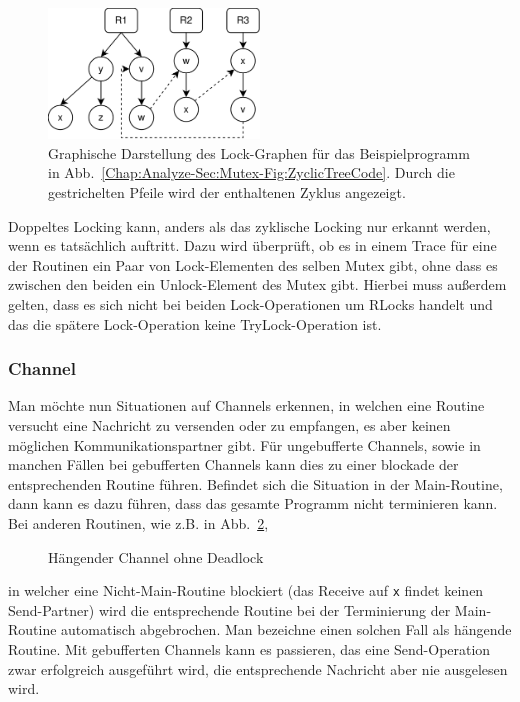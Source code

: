 \begin{figure}[h!]
  \centering
  \includegraphics[width=0.5\textwidth]{img/tree_example.eps}
  \caption{Graphische Darstellung des Lock-Graphen für das Beispielprogramm in 
    Abb.~\ref{Chap:Analyze-Sec:Mutex-Fig:ZyclicTreeCode}. Durch die gestrichelten 
    Pfeile wird der enthaltenen Zyklus angezeigt.}
    \label{Chap:Analyze-Sec:Mutex-Fig:ZyclicTreeImg}
\end{figure}
Doppeltes Locking kann, anders als das zyklische Locking nur erkannt werden, 
wenn es tatsächlich auftritt. Dazu wird überprüft, ob es in einem Trace 
für eine der Routinen ein Paar von Lock-Elementen des selben Mutex gibt, 
ohne dass es zwischen den beiden ein Unlock-Element des Mutex gibt. 
Hierbei muss außerdem gelten, dass es sich nicht bei beiden Lock-Operationen 
um RLocks handelt und das die spätere Lock-Operation keine TryLock-Operation ist.  



\subsubsection{Channel}\label{Chap:Theo-Sec:Analyze-SubSec:Channel}
Man möchte nun Situationen auf Channels erkennen, in welchen eine 
Routine versucht eine Nachricht zu versenden oder zu empfangen, es aber 
keinen möglichen Kommunikationspartner gibt. Für ungebufferte 
Channels, sowie in manchen Fällen bei gebufferten Channels kann dies zu einer 
blockade der entsprechenden Routine führen. Befindet sich die Situation in 
der Main-Routine, dann kann es dazu führen, dass das gesamte Programm 
nicht terminieren kann. Bei anderen Routinen, wie z.B. in 
Abb.~\ref{Chap:Analyze-Sec:Channel-SubSec:Dangling-Fig:ExDanglingWithout}, 
\begin{figure}[h!]
  
  \caption{Hängender Channel ohne Deadlock}
  \label{Chap:Analyze-Sec:Channel-SubSec:Dangling-Fig:ExDanglingWithout}
\end{figure}
in welcher eine Nicht-Main-Routine blockiert (das Receive auf \texttt{x} findet 
keinen Send-Partner) wird die entsprechende Routine bei der Terminierung 
der Main-Routine automatisch abgebrochen. Man bezeichne einen solchen Fall 
als hängende Routine. Mit gebufferten Channels kann es passieren, 
das eine Send-Operation zwar erfolgreich ausgeführt wird, die entsprechende
Nachricht aber nie ausgelesen wird.

